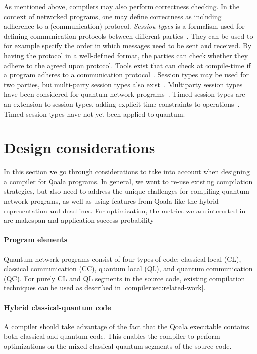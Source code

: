As mentioned above, compilers may also perform correctness checking.
In the context of networked programs, one may define correctness as including adherence to a (communication) protocol.
\emph{Session types} is a formalism used for defining communication protocols between different parties~\cite{honda_language_1998}.
They can be used to for example specify the order in which messages need to be sent and received.
By having the protocol in a well-defined format, the parties can check whether they adhere to the agreed upon protocol.
Tools exist that can check at compile-time if a program adheres to a communication protocol~\cite{davidson_model_nodate, ardeshir-larijani_automated_2018}.
Session types may be used for two parties, but multi-party session types also exist~\cite{honda_multiparty_2016}.
Multiparty session types have been considered for quantum network programs~\cite{lanese_towards_2024}.
Timed session types are an extension to session types, adding explicit time constraints to operations~\cite{bartoletti_timed_2017}.
Timed session types have not yet been applied to quantum.


\section{Design considerations}
\label{compiler:sec:design-considerations}
In this section we go through considerations to take into account when designing a compiler for Qoala programs.
In general, we want to re-use existing compilation strategies, but also need to address the unique challenges for compiling quantum network programs, as well as using features from Qoala like the hybrid representation and deadlines.
For optimization, the metrics we are interested in are makespan and application success probability.

\paragraph{Program elements}
Quantum network programs consist of four types of code: classical local (CL), classical communication (CC), quantum local (QL), and quantum communication (QC).
For purely CL and QL segments in the source code, existing compilation techniques can be used as described in \cref{compiler:sec:related-work}.

\paragraph{Hybrid classical-quantum code}
A compiler should take advantage of the fact that the Qoala executable contains both classical and quantum code.
This enables the compiler to perform optimizations on the mixed classical-quantum segments of the source code.


